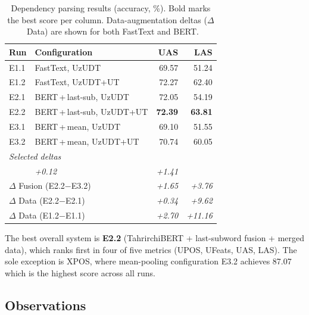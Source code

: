 \documentclass[runningheads]{llncs}
\begin{document}
\begin{table}[t]
\centering
\small
\begin{tabular*}{\textwidth}{@{\extracolsep{\fill}}llrr@{}}
\toprule
\textbf{Run} & \textbf{Configuration} & \textbf{UAS} & \textbf{LAS} \\
\midrule
E1.1 & FastText, UzUDT               & 69.57 & 51.24 \\
E1.2 & FastText, UzUDT+UT            & 72.27 & 62.40 \\
\addlinespace
E2.1 & BERT\,+\,last-sub, UzUDT      & 72.05 & 54.19 \\
E2.2 & BERT\,+\,last-sub, UzUDT+UT   & \textbf{72.39} & \textbf{63.81} \\
\addlinespace
E3.1 & BERT\,+\,mean, UzUDT           & 69.10 & 51.55 \\
E3.2 & BERT\,+\,mean, UzUDT+UT        & 70.74 & 60.05 \\
\midrule
\multicolumn{4}{l}{\textit{Selected deltas}} \\
\addlinespace
\multicolumn{2}{l}{$\Delta$ Embedding (E2.2$-$E1.2)}
      & \emph{+0.12} & \emph{+1.41} \\
\multicolumn{2}{l}{$\Delta$ Fusion (E2.2$-$E3.2)}
      & \emph{+1.65} & \emph{+3.76} \\
\multicolumn{2}{l}{$\Delta$ Data (E2.2$-$E2.1)}
      & \emph{+0.34} & \emph{+9.62} \\
\multicolumn{2}{l}{$\Delta$ Data (E1.2$-$E1.1)}
      & \emph{+2.70} & \emph{+11.16} \\
\bottomrule
\end{tabular*}
\caption{Dependency parsing results (accuracy, \%).
Bold marks the best score per column.
Data-augmentation deltas ($\Delta$~Data) are shown for both FastText and BERT.}
\label{tab:parsing_results}
\end{table}

The best overall system is \textbf{E2.2} (TahrirchiBERT + last-subword fusion + merged data), which ranks first in four of five metrics (UPOS, UFeats, UAS, LAS).
The sole exception is XPOS, where mean-pooling configuration E3.2 achieves 87.07 which is the highest score across all runs.

\subsection{Observations}
\label{sec:observations}
\end{document}
